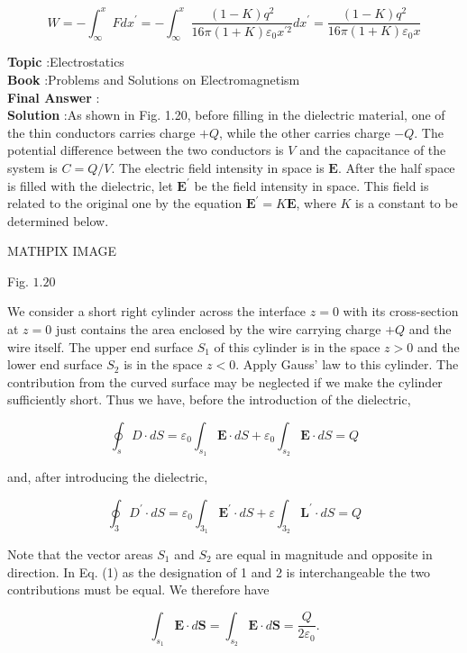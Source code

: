\documentclass[10pt]{article}
\begin{document}
$$
W=-\int_{\infty}^{x} F d x^{\prime}=-\int_{\infty}^{x} \frac{(1-K) q^{2}}{16 \pi(1+K) \varepsilon_{0} x^{\prime 2}} d x^{\prime}=\frac{(1-K) q^{2}}{16 \pi(1+K) \varepsilon_{0} x}
$$


\textbf{Topic} :Electrostatics\\
\textbf{Book} :Problems and Solutions on Electromagnetism\\
\textbf{Final Answer} :\\


\textbf{Solution} :As shown in Fig. 1.20, before filling in the dielectric material, one of the thin conductors carries charge $+Q$, while the other carries charge $-Q$. The potential difference between the two conductors is $V$ and the capacitance of the system is $C=Q / V$. The electric field intensity in space is $\mathbf{E}$. After the half space is filled with the dielectric, let $\mathbf{E}^{\prime}$ be the field intensity in space. This field is related to the original one by the equation $\mathbf{E}^{\prime}=K \mathbf{E}$, where $K$ is a constant to be determined below. 

MATHPIX IMAGE

Fig. $1.20$

We consider a short right cylinder across the interface $z=0$ with its cross-section at $z=0$ just contains the area enclosed by the wire carrying charge $+Q$ and the wire itself. The upper end surface $S_{1}$ of this cylinder is in the space $z>0$ and the lower end surface $S_{2}$ is in the space $z<0$. Apply Gauss' law to this cylinder. The contribution from the curved surface may be neglected if we make the cylinder sufficiently short. Thus we have, before the introduction of the dielectric,

$$
\oint_{s} D \cdot d S=\varepsilon_{0} \int_{s_{1}} \mathbf{E} \cdot d S+\varepsilon_{0} \int_{s_{2}} \mathbf{E} \cdot d S=Q
$$

and, after introducing the dielectric,

$$
\oint_{3} D^{\prime} \cdot d S=\varepsilon_{0} \int_{3_{1}} \mathbf{E}^{\prime} \cdot d S+\varepsilon \int_{3_{2}} \mathbf{L}^{\prime} \cdot d S=Q
$$

Note that the vector areas $S_{1}$ and $S_{2}$ are equal in magnitude and opposite in direction. In Eq.
(1) as the designation of 1 and 2 is interchangeable the two contributions must be equal. We therefore have

$$
\int_{s_{1}} \mathbf{E} \cdot d \mathbf{S}=\int_{s_{2}} \mathbf{E} \cdot d \mathbf{S}=\frac{Q}{2 \varepsilon_{0}} .
$$
\end{document}
